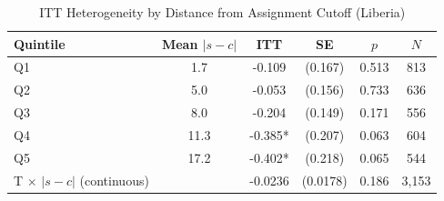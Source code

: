 \begin{table}[htbp]
\centering\small
\caption{ITT Heterogeneity by Distance from Assignment Cutoff (Liberia)}
\label{tab:cutoff_het}
\begin{tabular}{lccccc}
\toprule
Quintile & Mean $|s-c|$ & ITT & SE & $p$ & $N$ \\
\midrule
Q1 & 1.7 & -0.109 & (0.167) & 0.513 & 813 \\
Q2 & 5.0 & -0.053 & (0.156) & 0.733 & 636 \\
Q3 & 8.0 & -0.204 & (0.149) & 0.171 & 556 \\
Q4 & 11.3 & -0.385* & (0.207) & 0.063 & 604 \\
Q5 & 17.2 & -0.402* & (0.218) & 0.065 & 544 \\
\midrule
T $\times$ $|s-c|$ (continuous) & & -0.0236 & (0.0178) & 0.186 & 3,153 \\
\bottomrule
\end{tabular}
\par\smallskip{}
\end{table}